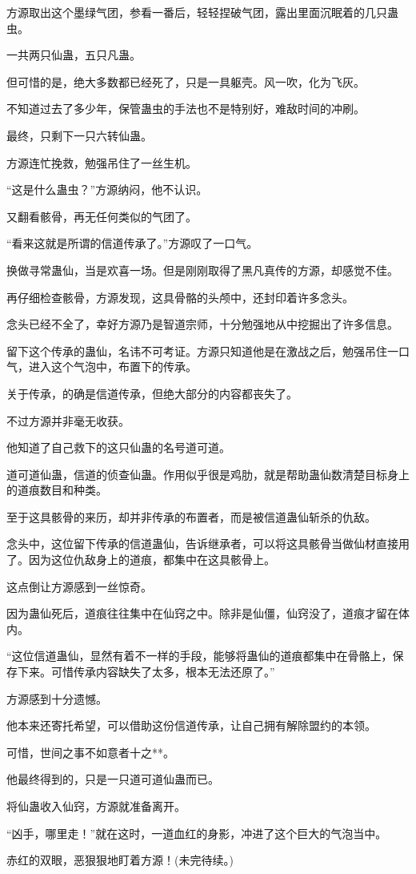 \begin{this_body}
方源取出这个墨绿气团，参看一番后，轻轻捏破气团，露出里面沉眠着的几只蛊虫。

一共两只仙蛊，五只凡蛊。

但可惜的是，绝大多数都已经死了，只是一具躯壳。风一吹，化为飞灰。

不知道过去了多少年，保管蛊虫的手法也不是特别好，难敌时间的冲刷。

最终，只剩下一只六转仙蛊。

方源连忙挽救，勉强吊住了一丝生机。

“这是什么蛊虫？”方源纳闷，他不认识。

又翻看骸骨，再无任何类似的气团了。

“看来这就是所谓的信道传承了。”方源叹了一口气。

换做寻常蛊仙，当是欢喜一场。但是刚刚取得了黑凡真传的方源，却感觉不佳。

再仔细检查骸骨，方源发现，这具骨骼的头颅中，还封印着许多念头。

念头已经不全了，幸好方源乃是智道宗师，十分勉强地从中挖掘出了许多信息。

留下这个传承的蛊仙，名讳不可考证。方源只知道他是在激战之后，勉强吊住一口气，进入这个气泡中，布置下的传承。

关于传承，的确是信道传承，但绝大部分的内容都丧失了。

不过方源并非毫无收获。

他知道了自己救下的这只仙蛊的名号道可道。

道可道仙蛊，信道的侦查仙蛊。作用似乎很是鸡肋，就是帮助蛊仙数清楚目标身上的道痕数目和种类。

至于这具骸骨的来历，却并非传承的布置者，而是被信道蛊仙斩杀的仇敌。

念头中，这位留下传承的信道蛊仙，告诉继承者，可以将这具骸骨当做仙材直接用了。因为这位仇敌身上的道痕，都集中在这具骸骨上。

这点倒让方源感到一丝惊奇。

因为蛊仙死后，道痕往往集中在仙窍之中。除非是仙僵，仙窍没了，道痕才留在体内。

“这位信道蛊仙，显然有着不一样的手段，能够将蛊仙的道痕都集中在骨骼上，保存下来。可惜传承内容缺失了太多，根本无法还原了。”

方源感到十分遗憾。

他本来还寄托希望，可以借助这份信道传承，让自己拥有解除盟约的本领。

可惜，世间之事不如意者十之**。

他最终得到的，只是一只道可道仙蛊而已。

将仙蛊收入仙窍，方源就准备离开。

“凶手，哪里走！”就在这时，一道血红的身影，冲进了这个巨大的气泡当中。

赤红的双眼，恶狠狠地盯着方源！(未完待续。)

\end{this_body}

